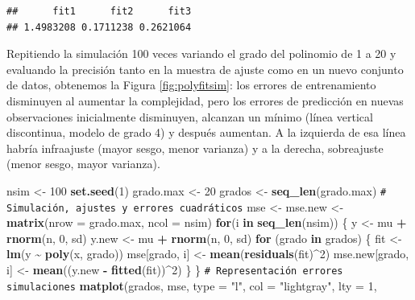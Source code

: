 \documentclass[
]{book}
\newenvironment{Shaded}{\begin{snugshade}}{\end{snugshade}}
\newcommand{\AttributeTok}[1]{\textcolor[rgb]{0.13,0.29,0.53}{#1}}
\newcommand{\CommentTok}[1]{\textcolor[rgb]{0.56,0.35,0.01}{\textit{#1}}}
\newcommand{\ControlFlowTok}[1]{\textcolor[rgb]{0.13,0.29,0.53}{\textbf{#1}}}
\newcommand{\DecValTok}[1]{\textcolor[rgb]{0.00,0.00,0.81}{#1}}
\newcommand{\FunctionTok}[1]{\textcolor[rgb]{0.13,0.29,0.53}{\textbf{#1}}}
\newcommand{\NormalTok}[1]{#1}
\newcommand{\OtherTok}[1]{\textcolor[rgb]{0.56,0.35,0.01}{#1}}
\newcommand{\SpecialCharTok}[1]{\textcolor[rgb]{0.81,0.36,0.00}{\textbf{#1}}}
\newcommand{\StringTok}[1]{\textcolor[rgb]{0.31,0.60,0.02}{#1}}
\theoremstyle{break}
\theoremstyle{nonumberplain}
\renewcommand{\CommentTok}[1]{\textcolor[rgb]{0.41,0.41,0.41}{\texttt{#1}}}
\begin{document}
\begin{verbatim}
##      fit1      fit2      fit3 
## 1.4983208 0.1711238 0.2621064
\end{verbatim}

Repitiendo la simulación 100 veces variando el grado del polinomio de 1 a 20 y evaluando la precisión tanto en la muestra de ajuste como en un nuevo conjunto de datos, obtenemos la Figura \ref{fig:polyfitsim}: los errores de entrenamiento disminuyen al aumentar la complejidad, pero los errores de predicción en nuevas observaciones inicialmente disminuyen, alcanzan un mínimo (línea vertical discontinua, modelo de grado 4) y después aumentan. A la izquierda de esa línea habría infraajuste (mayor sesgo, menor varianza) y a la derecha, sobreajuste (menor sesgo, mayor varianza).

\begin{Shaded}
\begin{Highlighting}[]
\NormalTok{nsim }\OtherTok{\textless{}{-}} \DecValTok{100}
\FunctionTok{set.seed}\NormalTok{(}\DecValTok{1}\NormalTok{)}
\NormalTok{grado.max }\OtherTok{\textless{}{-}} \DecValTok{20}
\NormalTok{grados }\OtherTok{\textless{}{-}} \FunctionTok{seq\_len}\NormalTok{(grado.max)}
\CommentTok{\# Simulación, ajustes y errores cuadráticos}
\NormalTok{mse }\OtherTok{\textless{}{-}}\NormalTok{ mse.new }\OtherTok{\textless{}{-}} \FunctionTok{matrix}\NormalTok{(}\AttributeTok{nrow =}\NormalTok{ grado.max, }\AttributeTok{ncol =}\NormalTok{ nsim)}
\ControlFlowTok{for}\NormalTok{(i }\ControlFlowTok{in} \FunctionTok{seq\_len}\NormalTok{(nsim)) \{}
\NormalTok{  y }\OtherTok{\textless{}{-}}\NormalTok{ mu }\SpecialCharTok{+} \FunctionTok{rnorm}\NormalTok{(n, }\DecValTok{0}\NormalTok{, sd)}
\NormalTok{  y.new }\OtherTok{\textless{}{-}}\NormalTok{ mu }\SpecialCharTok{+} \FunctionTok{rnorm}\NormalTok{(n, }\DecValTok{0}\NormalTok{, sd)}
  \ControlFlowTok{for}\NormalTok{ (grado }\ControlFlowTok{in}\NormalTok{ grados) \{}
\NormalTok{    fit }\OtherTok{\textless{}{-}} \FunctionTok{lm}\NormalTok{(y }\SpecialCharTok{\textasciitilde{}} \FunctionTok{poly}\NormalTok{(x, grado))}
\NormalTok{    mse[grado, i] }\OtherTok{\textless{}{-}} \FunctionTok{mean}\NormalTok{(}\FunctionTok{residuals}\NormalTok{(fit)}\SpecialCharTok{\^{}}\DecValTok{2}\NormalTok{)}
\NormalTok{    mse.new[grado, i] }\OtherTok{\textless{}{-}} \FunctionTok{mean}\NormalTok{((y.new }\SpecialCharTok{{-}} \FunctionTok{fitted}\NormalTok{(fit))}\SpecialCharTok{\^{}}\DecValTok{2}\NormalTok{)}
\NormalTok{  \}}
\NormalTok{\}}
\CommentTok{\# Representación errores simulaciones}
\FunctionTok{matplot}\NormalTok{(grados, mse, }\AttributeTok{type =} \StringTok{"l"}\NormalTok{, }\AttributeTok{col =} \StringTok{"lightgray"}\NormalTok{, }\AttributeTok{lty =} \DecValTok{1}\NormalTok{,}

\end{Highlighting}
\end{Shaded}
\end{document}
